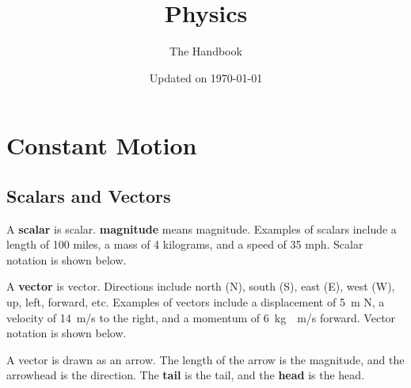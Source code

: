 \documentclass[dvipsnames]{article}
\title{Physics}
\author{The Handbook}
\date{Updated on \today}
\newif\ifShowUnitI
\begin{document}
\maketitle
\tableofcontents
\clearpage

\section{Constant Motion}

\ifShowUnitI

\subsection{Scalars and Vectors}


A \textbf{\gls{scalar}} is \glsdesc{scalar}. \textbf{\Gls{magnitude}} means \glsdesc{magnitude}. Examples of scalars include a length of 100 miles, a mass of 4 kilograms, and a speed of 35 mph. Scalar notation is shown below.

\begin{center}
\end{center}

A \textbf{\gls{vector}} is \glsdesc{vector}. Directions include north (N), south (S), east (E), west (W), up, left, forward, etc. Examples of vectors include a displacement of \SI{5}{m} N, a velocity of \SI{14}{m/s} to the right, and a momentum of \SI{6}{kg\cdot m/s} forward. Vector notation is shown below.

\begin{center}
\end{center}


A vector is drawn as an arrow. The length of the arrow is the magnitude, and the arrowhead is the direction. The \textbf{\gls{tail}} is the \glsdesc{tail}, and the \textbf{\gls{head}} is the \glsdesc{head}.
\end{document}
